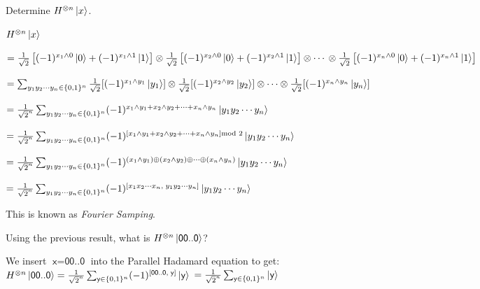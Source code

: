 \frmrule


\begin{example}
Determine $H^{\otimes n}\left|x\right\rangle$.
\end{example}


$H^{\otimes n}\left|x\right\rangle$

$= 
\frac{1}{\sqrt{2}} \left[(-1)^{x_1 \wedge 0} \left|0\right\rangle + (-1)^{x_1 \wedge 1} \left|1\right\rangle \right] \otimes
\frac{1}{\sqrt{2}} \left[(-1)^{x_2 \wedge 0} \left|0\right\rangle + (-1)^{x_2 \wedge 1} \left|1\right\rangle \right] \otimes
\dotsm 
\\ \otimes \frac{1}{\sqrt{2}} \left[(-1)^{x_n \wedge 0} \left|0\right\rangle + (-1)^{x_n \wedge 1} \left|1\right\rangle \right]
$

$= \sum_{y_1 y_2 \dotsm y_n \in \{0,1\}^n}
\frac{1}{\sqrt{2}} [(-1)^{x_1 \wedge y_1}\left|y_1\right\rangle] \otimes \frac{1}{\sqrt{2}} [(-1)^{x_2 \wedge y_2}\left|y_2\right\rangle] 
\otimes \dotsm \otimes \frac{1}{\sqrt{2}} [(-1)^{x_n \wedge y_n}\left|y_n\right\rangle]
$

$= 
\frac{1}{\sqrt{2}^n} \sum_{y_1 y_2 \dotsm y_n \in \{0,1\}^n}
(-1)^{x_1 \wedge y_1 + x_2 \wedge y_2 + \dotsm + x_n \wedge y_n} \left|y_1 y_2 \dotsm y_n\right\rangle
$

$= 
\frac{1}{\sqrt{2}^n} \sum_{y_1 y_2 \dotsm y_n \in \{0,1\}^n}
(-1)^{[x_1 \wedge y_1 + x_2 \wedge y_2 + \dotsm + x_n \wedge y_n] \text{mod } 2 } \left|y_1 y_2 \dotsm y_n\right\rangle
$

$= 
\frac{1}{\sqrt{2}^n} \sum_{y_1 y_2 \dotsm y_n \in \{0,1\}^n}
(-1)^{(x_1 \wedge y_1) \oplus (x_2 \wedge y_2) \oplus \dotsm \oplus (x_n \wedge y_n)} \left|y_1 y_2 \dotsm y_n\right\rangle
$

$= 
\frac{1}{\sqrt{2}^n} \sum_{y_1 y_2 \dotsm y_n \in \{0,1\}^n}
(-1)^{[x_1 x_2 \dotsm x_n, \; y_1 y_2 \dotsm y_n]} \left|y_1 y_2 \dotsm y_n\right\rangle
$




This is known as \textit{Fourier Samping}. 

\frmrule

\begin{example}
Using the previous result, what is $H^{\otimes n}\left|\textsf{00..0}\right\rangle$?
\end{example}

We insert $\textsf{x} = \textsf{00..0}$ into the Parallel Hadamard equation to get:\\
$H^{\otimes n}\left|\textsf{00..0}\right\rangle = 
\frac{1}{\sqrt{2}^n} \sum_{\textsf{y} \in \{0,1\}^n}
(-1)^{[\textsf{00..0}, \; \textsf{y}]} \left|\textsf{y}\right\rangle$
$ = \frac{1}{\sqrt{2}^n} \sum_{\textsf{y} \in \{0,1\}^n} \left|\textsf{y}\right\rangle$


